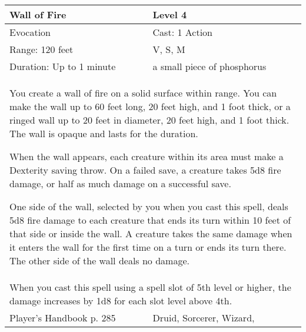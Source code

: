 \documentclass[11pt]{report}
\begin{document}
\begin{table}[H]
	\begin{tabular}{||p{6cm}|p{6cm}||}
		\hline\hline
		\bf{Wall of Fire} & Level 4\\ \hline
		Evocation & Cast: 1 Action\\ \hline
		Range: 120 feet & V, S, M\\ \hline
		Duration: Up to 1 minute & a small piece of phosphorus\\ \hline
		\multicolumn{2}{||p{12cm}||}{You create a wall of fire on a solid surface within range. You can make the wall up to 60 feet long, 20 feet high, and 1 foot thick, or a ringed wall up to 20 feet in diameter, 20 feet high, and 1 foot thick. The wall is opaque and lasts for the duration.

When the wall appears, each creature within its area must make a Dexterity saving throw. On a failed save, a creature takes 5d8 fire damage, or half as much damage on a successful save.

One side of the wall, selected by you when you cast this spell, deals 5d8 fire damage to each creature that ends its turn within 10 feet of that side or inside the wall. A creature takes the same damage when it enters the wall for the first time on a turn or ends its turn there. The other side of the wall deals no damage.}\\ \hline
		\multicolumn{2}{||p{12cm}||}{When you cast this spell using a spell slot of 5th level or higher, the damage increases by 1d8 for each slot level above 4th.}\\ \hline
Player's Handbook p. 285 & Druid, Sorcerer, Wizard, \\ \hline\hline
	\end{tabular}
\end{table}
\end{document}
